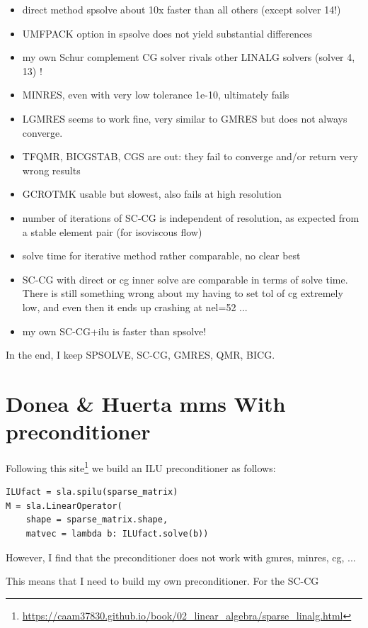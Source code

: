 \begin{itemize}
\item direct method spsolve about 10x faster than all others (except solver 14!)
\item UMFPACK option in spsolve does not yield substantial differences
\item my own Schur complement CG solver rivals other LINALG solvers (solver 4, 13) ! 
\item MINRES, even with very low tolerance 1e-10, ultimately fails
\item LGMRES seems to work fine, very similar to GMRES but does not always converge.
\item TFQMR, BICGSTAB, CGS are out: they fail to converge and/or return 
very wrong results
\item GCROTMK usable but slowest, also fails at high resolution 
\item number of iterations of SC-CG is independent of resolution, as expected
from a stable element pair (for isoviscous flow)
\item solve time for iterative method rather comparable, no clear best
\item SC-CG with direct or cg inner solve are comparable in terms of 
solve time. There is still something wrong about my having to 
set tol of cg extremely low, and even then it ends up crashing at nel=52 ...
\item my own SC-CG+ilu is faster than spsolve!
\end{itemize}

In the end, I keep SPSOLVE, SC-CG, GMRES, QMR, BICG.

\newpage
\section*{Donea \& Huerta mms With preconditioner}

Following this site\footnote{\url{https://caam37830.github.io/book/02_linear_algebra/sparse_linalg.html}}
we build an ILU preconditioner as follows:
\begin{lstlisting}
ILUfact = sla.spilu(sparse_matrix)
M = sla.LinearOperator(
    shape = sparse_matrix.shape,
    matvec = lambda b: ILUfact.solve(b))
\end{lstlisting}
However, I find that the preconditioner does not work with gmres, minres, cg, ...

This means that I need to build my own preconditioner. 
For the SC-CG 

